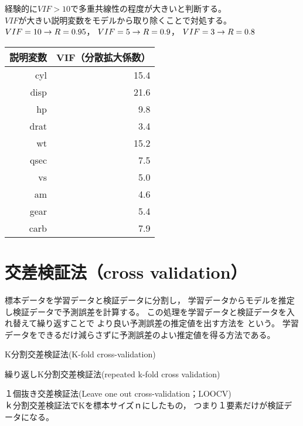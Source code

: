 \MyFrame{}
{
  経験的に$VIF>10$で多重共線性の程度が大きいと判断する。\\
  $VIF$が大きい説明変数をモデルから取り除くことで対処する。
  \footnotesize
  $VIF = 10 \rightarrow R = 0.95$，
  $VIF =  5 \rightarrow R = 0.9$，
  $VIF =  3 \rightarrow R = 0.8$
}

{
}

\MyFrame{}
{
    \begin{table}[h]
      \begin{tabular}{rr}
        \hline
        説明変数 & VIF（分散拡大係数） \\
        \hline
        cyl  & 15.4\\
        disp & 21.6\\
        hp   & 9.8\\
        drat & 3.4\\
        wt   & 15.2\\
        qsec & 7.5\\
        vs   & 5.0\\
        am   & 4.6\\
        gear & 5.4\\
        carb & 7.9\\
        \hline
      \end{tabular}
    \end{table}
}

\section{交差検証法（cross validation）}

\MyFrame{\insertsection}
{
  {
    標本データを学習データと検証データに分割し，
    学習データからモデルを推定し検証データで予測誤差を計算する。
    この処理を学習データと検証データを入れ替えて繰り返すことで
    より良い予測誤差の推定値を出す方法を
    という。
    学習データをできるだけ減らさずに予測誤差のよい推定値を得る方法である。
    \MyItems
    {
      \item K分割交差検証法(K-fold cross-validation)
      \item 繰り返しK分割交差検証法(repeated k-fold cross validation)
      \item １個抜き交差検証法(Leave one out cross-validation；LOOCV)\\
        ｋ分割交差検証法でKを標本サイズｎにしたもの，
        つまり１要素だけが検証データになる。
    }
  }
}

